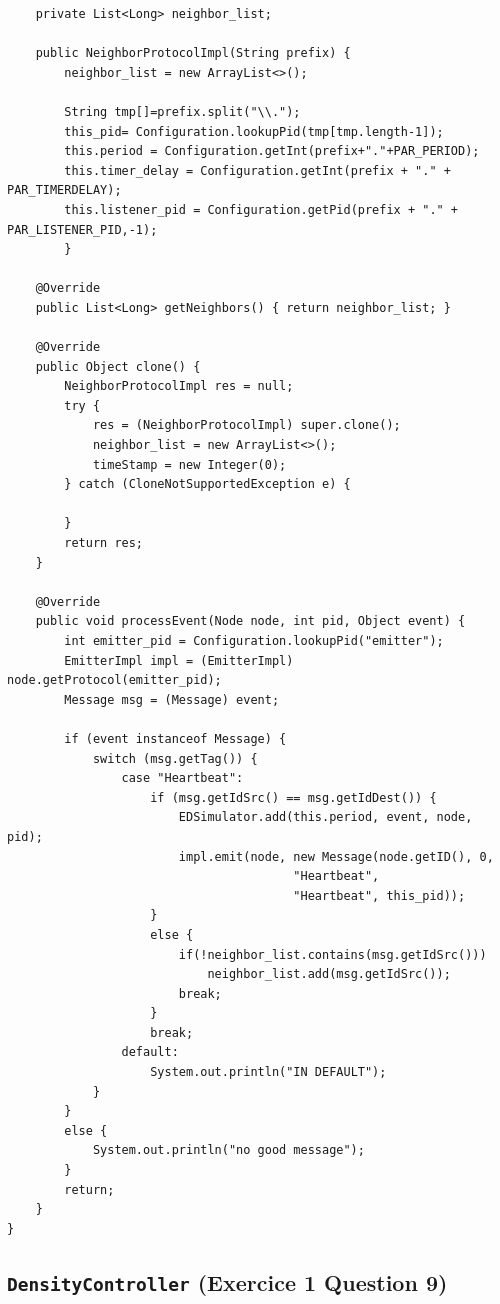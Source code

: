 \documentclass[a4paper]{article}
\begin{document}
\begin{appendix}
\begin{lstlisting}
    private List<Long> neighbor_list;

    public NeighborProtocolImpl(String prefix) {
        neighbor_list = new ArrayList<>();

        String tmp[]=prefix.split("\\.");
        this_pid= Configuration.lookupPid(tmp[tmp.length-1]);
        this.period = Configuration.getInt(prefix+"."+PAR_PERIOD);
        this.timer_delay = Configuration.getInt(prefix + "." + PAR_TIMERDELAY);
        this.listener_pid = Configuration.getPid(prefix + "." + PAR_LISTENER_PID,-1);
        }

    @Override
    public List<Long> getNeighbors() { return neighbor_list; }

    @Override
    public Object clone() {
        NeighborProtocolImpl res = null;
        try {
            res = (NeighborProtocolImpl) super.clone();
            neighbor_list = new ArrayList<>();
            timeStamp = new Integer(0);
        } catch (CloneNotSupportedException e) {

        }
        return res;
    }

    @Override
    public void processEvent(Node node, int pid, Object event) {
        int emitter_pid = Configuration.lookupPid("emitter");
        EmitterImpl impl = (EmitterImpl) node.getProtocol(emitter_pid);
        Message msg = (Message) event;

        if (event instanceof Message) {
            switch (msg.getTag()) {
                case "Heartbeat":
                    if (msg.getIdSrc() == msg.getIdDest()) {
                        EDSimulator.add(this.period, event, node, pid);
                        impl.emit(node, new Message(node.getID(), 0,
                                        "Heartbeat",
                                        "Heartbeat", this_pid));
                    }
                    else {
                        if(!neighbor_list.contains(msg.getIdSrc()))
                            neighbor_list.add(msg.getIdSrc());
                        break;
                    }
                    break;
                default:
                    System.out.println("IN DEFAULT");
            }
        }
        else {
            System.out.println("no good message");
        }
        return;
    }
}
\end{lstlisting}


\subsection{\texttt{DensityController} (Exercice 1 Question 9)}


\end{appendix}
\end{document}
